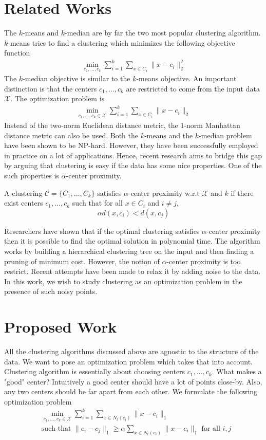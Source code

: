 \documentclass{article}
\newcommand{\mc}{\mathcal}
\begin{document}
\section{Related Works}
The $k$-means and $k$-median are by far the two most popular clustering algorithm. $k$-means tries to find a clustering which minimizes the following objective function
\begin{align*}
	\min_{c_1, \ldots, c_k} \sum_{i=1}^k \sum_{x \in C_i} \|x-c_i\|_2^2 
\end{align*}
The $k$-median objective is similar to the $k$-means objective. An important distinction is that the centers $c_1, \ldots, c_k$ are restricted to come from the input data $\mc X$. The optimization problem is
\begin{align*}
	\min_{c_1, \ldots, c_k \in \mc X} \sum_{i=1}^k \sum_{x \in C_i} \|x-c_i\|_2 
\end{align*}
Instead of the two-norm Euclidean distance metric, the $1$-norm Manhattan distance metric can also be used. Both the $k$-means and the $k$-median problem have been shown to be NP-hard. However, they have been successfully employed in practice on a lot of applications. Hence, recent research aims to bridge this gap by arguing that clustering is easy if the data has some nice properties. One of the such properties is $\alpha$-center proximity. 

A clustering $\mc C = \{C_1, \ldots, C_k\}$ satisfies $\alpha$-center proximity w.r.t $\mc X$ and $k$ if there exist centers $c_1, \ldots, c_k$  such that for all $x \in C_i$ and $i\neq j$, $$\alpha d(x, c_i) < d(x, c_j)$$

Researchers have shown that if the optimal clustering satisfies $\alpha$-center proximity then it is possible to find the optimal solution in polynomial time. The algorithm works by building a hierarchical clustering tree on the input and then finding a pruning of minimum cost. However, the notion of $\alpha$-center proximity is too restrict. Recent attempts have been made to relax it by adding noise to the data. In this work, we wish to study clustering as an optimization problem in the presence of such noisy points.  

\section{Proposed Work}
All the clustering algorithms discussed above are agnostic to the structure of the data. We want to pose an optimization problem which takes that into account. Clustering algorithm is essentially about choosing centers $c_1, \ldots, c_k$. What makes a "good" center? Intuitively a good center should have a lot of points close-by. Also, any two centers should be far apart from each other. We formulate the following optimization problem
\begin{align*}
	&\min_{c_1, \ldots, c_k \in \mc X} \sum_{i=1}^k \sum_{x \in N_t(c_i)} \|x-c_i\|_1 \\
	& \text{such that } \|c_i - c_j\|_1 \ge \alpha  \sum_{x \in N_t(c_i)} \|x-c_i\|_1 \text{ for all }i, j
\end{align*}
\end{document}
